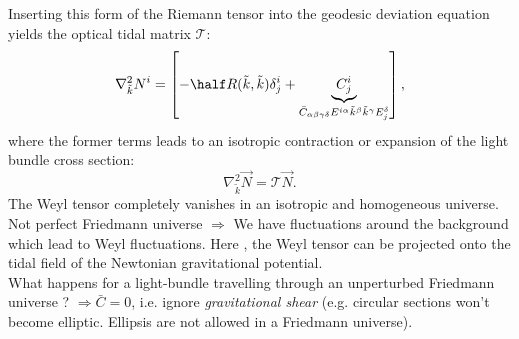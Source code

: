 Inserting this form of the Riemann tensor into the geodesic deviation equation yields the optical tidal matrix $\mathcal{T}$:
\begin{equation}
\nabla^2_{\tilde{k}} N^i = \left[-\half R(\tilde{k},\tilde{k})\delta^i_j + \underbrace{C^i_j}_{\bar{C}_{\alpha \beta \gamma \delta} E^{i\alpha} \tilde{k}^{\beta} \tilde{k}^{\gamma} E^{\delta}_j} \right],
\end{equation}
where the former terms leads to an isotropic contraction or expansion of the light bundle cross section:
\begin{equation}
	\nabla^2_{\tilde{k}} \vec{N} = \mathcal{T} \vec{N}.
\end{equation}
The Weyl tensor completely vanishes in an isotropic and homogeneous universe. Not perfect Friedmann universe $\Rightarrow$ We have fluctuations around the background which lead to Weyl fluctuations. Here , the Weyl tensor can be projected onto the tidal field of the Newtonian gravitational potential.\\
What happens for a light-bundle travelling through an unperturbed Friedmann universe ? $\Rightarrow \bar{C}=0$, i.e. ignore \emph{gravitational shear} (e.g. circular sections won't become elliptic. Ellipsis are not allowed in a Friedmann universe).
